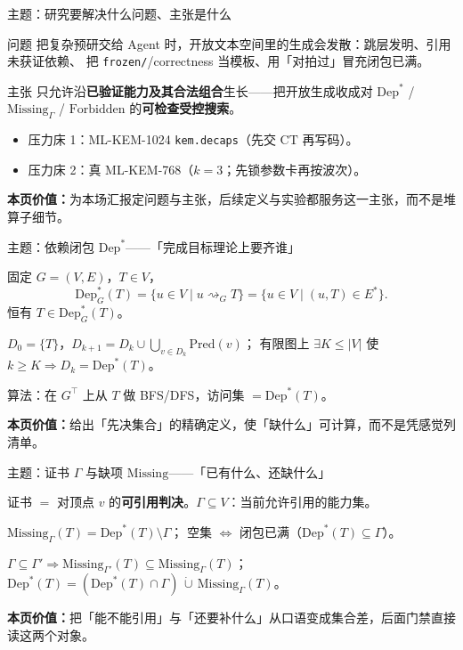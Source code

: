 \documentclass[UTF8,aspectratio=169,11pt]{ctexbeamer}
\newcommand{\pagesummary}[1]{%
  \vfill
  {\footnotesize\noindent\textbf{本页价值：}#1\par}%
}
\begin{document}
\begin{frame}{主题：研究要解决什么问题、主张是什么}
\begin{block}{问题}
把复杂预研交给 Agent 时，开放文本空间里的生成会发散：跳层发明、引用未获证依赖、
把 \texttt{frozen/}/correctness 当模板、用「对拍过」冒充闭包已满。
\end{block}
\begin{block}{主张}
只允许沿\textbf{已验证能力及其合法组合}生长——把开放生成收成对
$\mathrm{Dep}^*$ / $\mathrm{Missing}_\Gamma$ / $\mathrm{Forbidden}$ 的\textbf{可检查受控搜索}。
\end{block}
\begin{itemize}
  \item 压力床 1：ML-KEM-1024 \texttt{kem.decaps}（先交 $\mathrm{CT}$ 再写码）。
  \item 压力床 2：真 ML-KEM-768（$k{=}3$；先锁参数卡再按波次）。
\end{itemize}
\pagesummary{为本场汇报定问题与主张，后续定义与实验都服务这一主张，而不是堆算子细节。}
\end{frame}

\begin{frame}{主题：依赖闭包 $\mathrm{Dep}^*$——「完成目标理论上要齐谁」}
\begin{definition}[单点依赖闭包（教材）]
固定 $G=(V,E)$，$T\in V$，
\[
\mathrm{Dep}^*_G(T)
=\{u\in V\mid u\rightsquigarrow_G T\}
=\{u\in V\mid (u,T)\in E^{*}\}.
\]
恒有 $T\in\mathrm{Dep}^*_G(T)$。
\end{definition}
\begin{theorem}[迭代收敛]
$D_0=\{T\}$，$D_{k+1}=D_k\cup\bigcup_{v\in D_k}\mathrm{Pred}(v)$；
有限图上 $\exists K\le|V|$ 使 $k\ge K\Rightarrow D_k=\mathrm{Dep}^*(T)$。
\end{theorem}
{\footnotesize 算法：在 $G^\top$ 上从 $T$ 做 BFS/DFS，访问集 $=\mathrm{Dep}^*(T)$。}
\pagesummary{给出「先决集合」的精确定义，使「缺什么」可计算，而不是凭感觉列清单。}
\end{frame}

\begin{frame}{主题：证书 $\Gamma$ 与缺项 $\mathrm{Missing}$——「已有什么、还缺什么」}
\begin{definition}[证书 / $\Gamma$]
证书 $=$ 对顶点 $v$ 的\textbf{可引用判决}。$\Gamma\subseteq V$：当前允许引用的能力集。
\end{definition}
\begin{definition}[缺项]
$\mathrm{Missing}_\Gamma(T)=\mathrm{Dep}^*(T)\setminus\Gamma$；
空集 $\iff$ 闭包已满（$\mathrm{Dep}^*(T)\subseteq\Gamma$）。
\end{definition}
\begin{theorem}[缺项基本性质（摘）]
$\Gamma\subseteq\Gamma'\Rightarrow\mathrm{Missing}_{\Gamma'}(T)\subseteq\mathrm{Missing}_\Gamma(T)$；
$\mathrm{Dep}^*(T)=(\mathrm{Dep}^*(T)\cap\Gamma)\,\dot\cup\,\mathrm{Missing}_\Gamma(T)$。
\end{theorem}
\pagesummary{把「能不能引用」与「还要补什么」从口语变成集合差，后面门禁直接读这两个对象。}
\end{frame}
\end{document}
